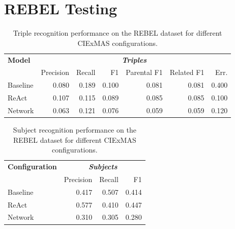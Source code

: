 \documentclass[a4paper,oneside,bibliography=totoc]{scrbook}
\begin{document}
\section{REBEL Testing}
\label{sec:rebel_testing}
\begin{table}[h]
  \centering
  \begin{tabular}{l|rrrrrr}
    \toprule
    \textbf{Model} & \multicolumn{6}{c}{\textit{\textbf{Triples}}}                                                     \\
                   & Precision                                     & Recall & F1    & Parental F1 & Related F1 & Err.  \\
    \midrule
    Baseline       & 0.080                                         & 0.189  & 0.100 & 0.081       & 0.081      & 0.400 \\
    {\ac{ReAct}}   & 0.107                                         & 0.115  & 0.089 & 0.085       & 0.085      & 0.100 \\
    Network        & 0.063                                         & 0.121  & 0.076 & 0.059       & 0.059      & 0.120 \\
    \bottomrule
  \end{tabular}
  \caption{Triple recognition performance on the REBEL dataset for different CIExMAS configurations.}
  \label{tab:rebel_comprehensive_results}
\end{table}

\begin{table}[h]
  \centering
  \begin{tabular}{l|rrr}
    \toprule
    \textbf{Configuration} & \multicolumn{3}{c}{\textit{\textbf{Subjects}}}                  \\
                           & Precision                                      & Recall & F1    \\
    \midrule
    Baseline               & 0.417                                          & 0.507  & 0.414 \\
    {\ac{ReAct}}           & 0.577                                          & 0.410  & 0.447 \\
    Network                & 0.310                                          & 0.305  & 0.280 \\
    \bottomrule
  \end{tabular}
  \caption{Subject recognition performance on the REBEL dataset for different CIExMAS configurations.}
  \label{tab:rebel_subjects}
\end{table}
\end{document}
